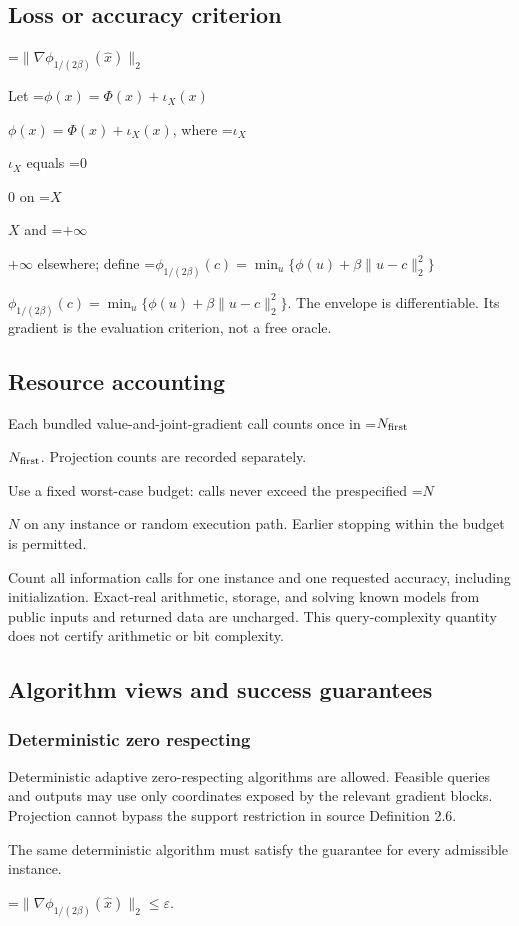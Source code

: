 \documentclass[10pt,a4paper]{article}
\newcommand{\AtlasMath}[1]{\par\begingroup\centering\setbox0=\hbox{$\displaystyle #1$}\ifdim\wd0>1.4\linewidth\typeout{ATLAS WIDE FORMULA: \the\wd0}\fi\ifdim\wd0>\linewidth\resizebox{\linewidth}{!}{\box0}\else\box0\fi\par\endgroup}
\newcommand{\AtlasInlineMath}[1]{\begingroup\setbox0=\hbox{$#1$}\ifdim\wd0>.4\linewidth\endgroup\AtlasMath{#1}\else\endgroup$#1$\fi}
\begin{document}
\subsection{Loss or accuracy criterion}

\AtlasMath{\|\nabla\phi_{1/(2\beta)}(\widehat{x})\|_2}


Let \AtlasInlineMath{\phi(x)=\Phi(x)+\iota_X(x)}, where \AtlasInlineMath{\iota_X} equals \AtlasInlineMath{0} on \AtlasInlineMath{X} and \AtlasInlineMath{+\infty} elsewhere; define \AtlasInlineMath{\phi_{1/(2\beta)}(c)=\min_u\{\phi(u)+\beta\|u-c\|_2^2\}}. The envelope is differentiable. Its gradient is the evaluation criterion, not a free oracle.

\subsection{Resource accounting}
Each bundled value-and-joint-gradient call counts once in \AtlasInlineMath{N_{\rm first}}. Projection counts are recorded separately.

Use a fixed worst-case budget: calls never exceed the prespecified \AtlasInlineMath{N} on any instance or random execution path. Earlier stopping within the budget is permitted.

Count all information calls for one instance and one requested accuracy, including initialization. Exact-real arithmetic, storage, and solving known models from public inputs and returned data are uncharged. This query-complexity quantity does not certify arithmetic or bit complexity.

\subsection{Algorithm views and success guarantees}
\subsubsection{Deterministic zero respecting}
Deterministic adaptive zero-respecting algorithms are allowed. Feasible queries and outputs may use only coordinates exposed by the relevant gradient blocks. Projection cannot bypass the support restriction in source Definition 2.6.

The same deterministic algorithm must satisfy the guarantee for every admissible instance.


\AtlasMath{\|\nabla\phi_{1/(2\beta)}(\widehat{x})\|_2\le\varepsilon.}
\end{document}
